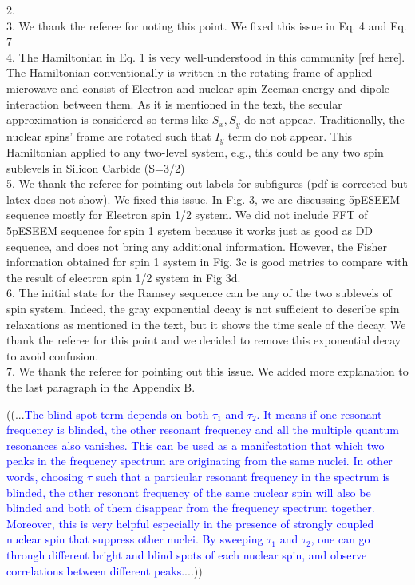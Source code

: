 \documentclass[12pt]{amsart}
\begin{document}
	2. \\
	
	3. We thank the referee for noting this point. We fixed this issue in Eq. 4 and Eq. 7  \\
	
	4. The Hamiltonian in Eq. 1 is very well-understood in this community [ref here]. The Hamiltonian conventionally is written in the rotating frame of applied microwave and consist of Electron and nuclear spin Zeeman energy and dipole interaction between them. As it is mentioned in the text, the secular approximation is considered so terms like $S_x, S_y$ do not appear. Traditionally, the nuclear spins' frame are rotated such that $I_y$ term do not appear. This Hamiltonian applied to any two-level system, e.g., this could be any two spin sublevels in Silicon Carbide (S=3/2)\\
	
	5. We thank the referee for pointing out labels for subfigures (pdf is corrected but latex does not show). We fixed this issue. In Fig. 3, we are discussing 5pESEEM sequence mostly for Electron spin 1/2 system. We did not include FFT of 5pESEEM sequence for spin 1 system because it works just as good as DD sequence, and does not bring any additional information. However, the Fisher information obtained for spin 1 system in Fig. 3c is good metrics to compare with the result of electron spin 1/2 system in Fig 3d.  \\
	
	6. The initial state for the Ramsey sequence can be any of the two sublevels of spin system. Indeed, the gray exponential decay is not sufficient to describe spin relaxations as mentioned in the text, but it shows the time scale of the decay. We thank the referee for this point and we decided to remove this exponential decay to avoid confusion. \\
	 
	7. We thank the referee for pointing out this issue. We added more explanation to the last paragraph in the Appendix B.
	
	((...\textcolor{blue}{The blind spot term depends on both $\tau_1$ and $\tau_2$. It means if one resonant frequency is blinded, the other resonant frequency and all the multiple quantum resonances also vanishes. This can be used as a manifestation that which two peaks in the frequency spectrum are originating from the same nuclei. In other words, choosing $\tau$ such that a particular resonant frequency in the spectrum is blinded, the other resonant frequency of the same nuclear spin will also be blinded and both of them disappear from the frequency spectrum together. Moreover, this is very helpful especially in the presence of strongly coupled nuclear spin that suppress other nuclei. By sweeping $\tau_1$ and $\tau_2$, one can go through different bright and blind spots of each nuclear spin, and observe correlations between different peaks.}...))\\
	
\end{document}
